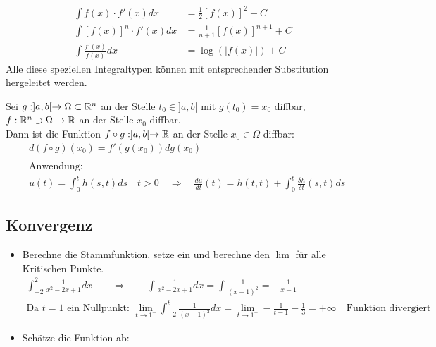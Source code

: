 \documentclass[a4paper]{article}
\begin{document}
		\begin{falgo}
			\begin{align*}
				\int f(x)\cdot f'(x) dx &= \frac{1}{2}[f(x)]^2 +C\\
				\int [f(x)]^n \cdot f'(x) dx &= \frac{1}{n+1}[f(x)]^{n+1}+C\\
				\int \frac{f'(x)}{f(x)}dx &= \log(|f(x)|) +C
			\end{align*}
			Alle diese speziellen Integraltypen können mit entsprechender Substitution hergeleitet werden.
		\end{falgo}
		\begin{fmerke}
			Sei $g: ]a,b[ \rightarrow \Omega \subset \mathbb{R}^n$ an der Stelle $t_0 \in ]a,b[$ mit $g(t_0) = x_0$ diffbar, $f:\mathbb{R}^n \supset \Omega \rightarrow \mathbb{R}$ an der Stelle $x_0$ diffbar. 
			\\
			Dann ist die Funktion $f \circ g: ]a,b[ \rightarrow \mathbb{R}$ an der Stelle $x_0 \in \Omega$ diffbar:
			\begin{align*}
				&d\left( f \circ g \right) (x_0) = f'(g(x_0)) dg(x_0)\\
				\\
				&\text{Anwendung:}\\
				&u(t) = \int_0^t h(s,t) ds \quad t > 0 \quad \Rightarrow \quad \frac{du}{dt}(t) = h(t,t) + \int_0^t \frac{\delta h}{\delta t}(s,t) ds
			\end{align*}	
		\end{fmerke}

	\subsection{Konvergenz}
		\begin{fmerke}
			\begin{itemize}
			 \item Berechne die Stammfunktion, setze ein und berechne den $\lim$ für alle Kritischen Punkte.
			 	\begin{align*}
			 		\int_{-2}^2  \frac{1}{x^2-2x+1}dx \qquad \Longrightarrow \qquad \int \frac{1}{x^2-2x+1}dx = \int \frac{1}{(x-1)^2}= -\frac{1}{x-1}\\
			 		\text{Da $t=1$ ein Nullpunkt: }\lim_{t\rightarrow 1^{-}} \int_{-2}^t \frac{1}{(x-1)^2}dx= \lim_{t \rightarrow 1^{-}} - \frac{1}{t-1} - \frac{1}{3} = +\infty \quad \text{Funktion divergiert}
			 	\end{align*}
			 \item Schätze die Funktion ab: 
			 	
			 	
			\end{itemize}

		\end{fmerke}
\end{document}
